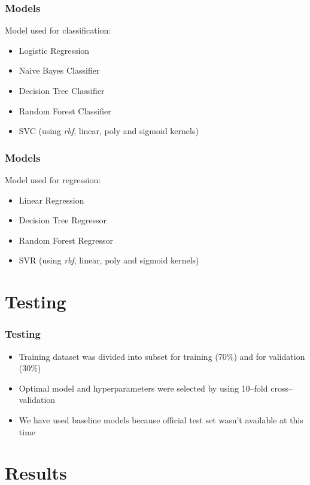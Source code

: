 \documentclass[utf8]{beamer}
\begin{document}

\begin{frame}
	\frametitle{Models}
	Model used for classification:
	\begin{itemize}
		\item Logistic Regression
		\item Naive Bayes Classifier
		\item Decision Tree Classifier
		\item Random Forest Classifier
		\item SVC (using \textit{rbf}, linear, poly and sigmoid kernels)
	\end{itemize}
\end{frame}


\begin{frame}
	\frametitle{Models}
	Model used for regression:
	\begin{itemize}
		\item Linear Regression
		\item Decision Tree Regressor
		\item Random Forest Regressor
		\item SVR (using \textit{rbf}, linear, poly and sigmoid kernels)
	\end{itemize}
\end{frame}

\section{Testing}
\frame{\tableofcontents[currentsection]}
\begin{frame}
	\frametitle{Testing}
	\begin{itemize}
		\item Training dataset was divided into subset for training (70\%) and for validation (30\%)
		\item Optimal model and hyperparameters were selected by using 10–fold cross–validation
		\item We have used baseline models because official test set wasn't available at this time
	\end{itemize}
\end{frame}
\section{Results}
\end{document}
